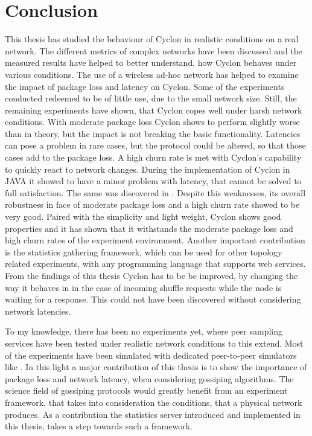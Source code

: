 \chapter{Conclusion} 
\label{chap:conclusion}
This thesis has studied the behaviour of Cyclon in realistic conditions on a
real network. The different metrics of complex networks have been discussed and
the measured results have helped to better understand, how Cyclon behaves under
various conditions. The use of a wireless ad-hoc network has helped to examine
the impact of package loss and latency on Cyclon.  Some of the experiments
conducted redeemed to be of little use, due to the small network size. Still,
the remaining experiments have shown, that Cyclon copes well under harsh network
conditions. With moderate package loss Cyclon shows to perform slightly worse
than in theory, but the impact is not breaking the basic functionality.
Latencies can pose a problem in rare cases, but the protocol could be altered,
so that those cases add to the package loss. A high churn rate is met with
Cyclon's capability to quickly react to network changes. During the
implementation of Cyclon in JAVA it showed to have a minor problem with
latency, that cannot be solved to full satisfaction. The same was discovered
in \cite{matoslaystream}. Despite this weaknesses, its overall robustness in
face of moderate package loss and a high churn rate showed to be very good. Paired
with the simplicity and light weight, Cyclon shows good properties and it has
shown that it withstands the moderate package loss and high churn rates of the
experiment environment. Another important contribution is the statistics
gathering framework, which can be used for other topology related experiments,
with any programming language that supports web services.
From the findings of this thesis Cyclon has to be be improved, by changing the
way it behaves in in the case of incoming shuffle requests while the node is
waiting for a response. This could not have been discovered without considering
network latencies.

To my knowledge, there has been no experiments yet, where peer sampling
services have been tested under realistic network conditions to this extend.
Most of the experiments have been simulated with dedicated peer-to-peer
simulators like \cite{montresor2009peersim}. In this light a major contribution
of this thesis is to show the importance of package loss and network latency,
when considering gossiping algorithms. The science field of gossiping protocols
would greatly benefit from an experiment framework, that takes into
consideration the conditions, that a physical network produces. As a
contribution the statistics server introduced and implemented in this thesis, takes a step
towards such a framework.
